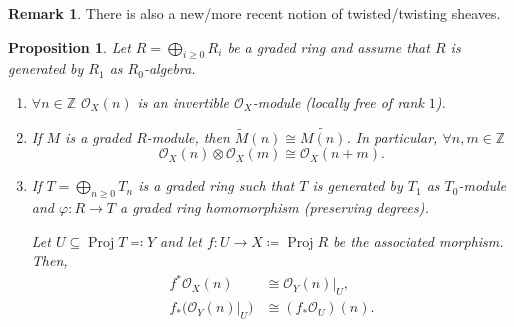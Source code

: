 \documentclass[12pt]{article}
\DeclareMathOperator{\Proj}{Proj}
\newtheorem*{proposition}{Proposition}
\theoremstyle{definition}
\newtheorem*{remark}{Remark}
\theoremstyle{remark}
\begin{document}
\begin{remark}
There is also a new/more recent notion of twisted/twisting sheaves.
\end{remark}

\begin{proposition}
Let $R=\bigoplus_{i\geq0}R_i$ be a graded ring and assume that $R$ is generated by $R_1$ as $R_0$-algebra.

\begin{enumerate}[label=\arabic*)]
\item $\forall n\in\mathbb{Z}$ $\mathcal{O}_X(n)$ is an invertible $\mathcal{O}_X$-module (locally free of rank $1$).

\item If $M$ is a graded $R$-module, then $\widetilde{M}(n)\cong\widetilde{M(n)}$. In particular, $\forall n,m\in\mathbb{Z}$
\[\mathcal{O}_X(n)\otimes\mathcal{O}_X(m)\cong\mathcal{O}_X(n+m).\]

\item If $T=\bigoplus_{n\geq0}T_n$ is a graded ring such that $T$ is generated by $T_1$ as $T_0$-module and $\varphi:R\rightarrow T$ a graded ring homomorphism (preserving degrees).

Let $U\subseteq\Proj T\eqqcolon Y$ and let $f:U\rightarrow X\coloneqq\Proj R$ be the associated morphism. Then,
\begin{align*}
f^*\mathcal{O}_X(n)&\cong\mathcal{O}_Y(n)|_U,\\
f_*\big(\mathcal{O}_Y(n)|_U\big)&\cong(f_*\mathcal{O}_U)(n).
\end{align*}
\end{enumerate}
\end{proposition}
\end{document}

